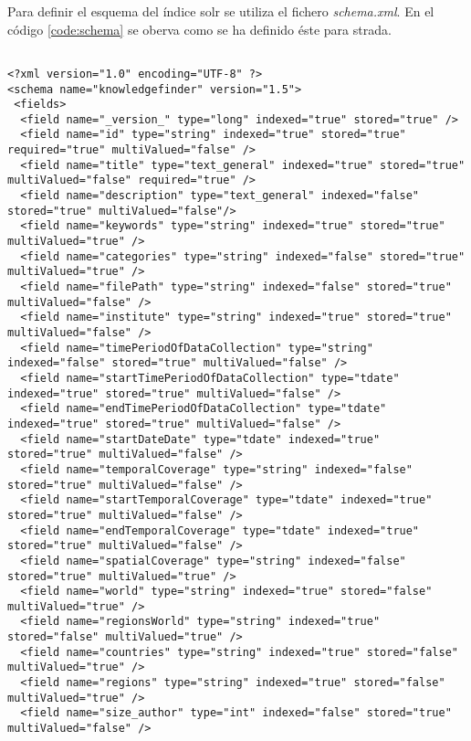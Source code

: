 Para definir el esquema del índice \gls{solr} se utiliza el fichero \textit{schema.xml}. En el código \ref{code:schema} se oberva como se ha definido éste para \gls{strada}.

\begin{listing}[H]
\begin{verbatim}
                
<?xml version="1.0" encoding="UTF-8" ?>
<schema name="knowledgefinder" version="1.5">
 <fields>
  <field name="_version_" type="long" indexed="true" stored="true" />
  <field name="id" type="string" indexed="true" stored="true" required="true" multiValued="false" />
  <field name="title" type="text_general" indexed="true" stored="true" multiValued="false" required="true" />
  <field name="description" type="text_general" indexed="false" stored="true" multiValued="false"/>
  <field name="keywords" type="string" indexed="true" stored="true" multiValued="true" />
  <field name="categories" type="string" indexed="false" stored="true" multiValued="true" />
  <field name="filePath" type="string" indexed="false" stored="true" multiValued="false" />
  <field name="institute" type="string" indexed="true" stored="true" multiValued="false" />
  <field name="timePeriodOfDataCollection" type="string" indexed="false" stored="true" multiValued="false" />
  <field name="startTimePeriodOfDataCollection" type="tdate" indexed="true" stored="true" multiValued="false" />
  <field name="endTimePeriodOfDataCollection" type="tdate" indexed="true" stored="true" multiValued="false" />
  <field name="startDateDate" type="tdate" indexed="true" stored="true" multiValued="false" />
  <field name="temporalCoverage" type="string" indexed="false" stored="true" multiValued="false" />
  <field name="startTemporalCoverage" type="tdate" indexed="true" stored="true" multiValued="false" />
  <field name="endTemporalCoverage" type="tdate" indexed="true" stored="true" multiValued="false" />
  <field name="spatialCoverage" type="string" indexed="false" stored="true" multiValued="true" />
  <field name="world" type="string" indexed="true" stored="false" multiValued="true" />
  <field name="regionsWorld" type="string" indexed="true" stored="false" multiValued="true" /> 
  <field name="countries" type="string" indexed="true" stored="false" multiValued="true" />
  <field name="regions" type="string" indexed="true" stored="false" multiValued="true" />
  <field name="size_author" type="int" indexed="false" stored="true" multiValued="false" />

\end{verbatim}
\end{listing}
